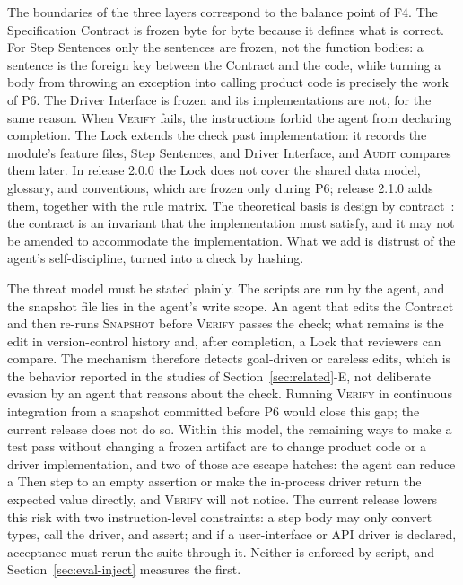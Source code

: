 \documentclass[conference]{IEEEtran}
\begin{document}
The boundaries of the three layers correspond to the balance point of F4. The Specification Contract is frozen byte for byte because it defines what is correct. For Step Sentences only the sentences are frozen, not the function bodies: a sentence is the foreign key between the Contract and the code, while turning a body from throwing an exception into calling product code is precisely the work of P6. The Driver Interface is frozen and its implementations are not, for the same reason. When \textsc{Verify} fails, the instructions forbid the agent from declaring completion. The Lock extends the check past implementation: it records the module's feature files, Step Sentences, and Driver Interface, and \textsc{Audit} compares them later. In release 2.0.0 the Lock does not cover the shared data model, glossary, and conventions, which are frozen only during P6; release 2.1.0 adds them, together with the rule matrix. The theoretical basis is design by contract~\cite{meyer1992dbc}: the contract is an invariant that the implementation must satisfy, and it may not be amended to accommodate the implementation. What we add is distrust of the agent's self-discipline, turned into a check by hashing.

The threat model must be stated plainly. The scripts are run by the agent, and the snapshot file lies in the agent's write scope. An agent that edits the Contract and then re-runs \textsc{Snapshot} before \textsc{Verify} passes the check; what remains is the edit in version-control history and, after completion, a Lock that reviewers can compare. The mechanism therefore detects goal-driven or careless edits, which is the behavior reported in the studies of Section~\ref{sec:related}-E, not deliberate evasion by an agent that reasons about the check. Running \textsc{Verify} in continuous integration from a snapshot committed before P6 would close this gap; the current release does not do so. Within this model, the remaining ways to make a test pass without changing a frozen artifact are to change product code or a driver implementation, and two of those are escape hatches: the agent can reduce a Then step to an empty assertion or make the in-process driver return the expected value directly, and \textsc{Verify} will not notice. The current release lowers this risk with two instruction-level constraints: a step body may only convert types, call the driver, and assert; and if a user-interface or API driver is declared, acceptance must rerun the suite through it. Neither is enforced by script, and Section~\ref{sec:eval-inject} measures the first.
\end{document}
